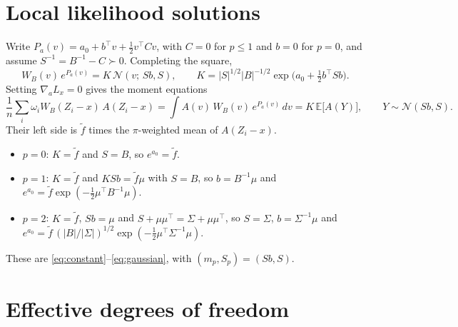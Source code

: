\documentclass[11pt]{article}
\newcommand{\E}{\mathbb{E}}
\newcommand{\N}{\mathcal{N}}
\begin{document}
\appendix

\section{Local likelihood solutions}
\label{app:locallik}

Write $P_a(v) = a_0 + b^\top v + \frac12 v^\top C v$, with $C = 0$ for $p \leq
1$ and $b = 0$ for $p = 0$, and assume $S^{-1} = B^{-1} - C \succ 0$.
Completing the square,
\[
  W_B(v)\, e^{P_a(v)} = K\, \N(v;\, S b, S), \qquad
  K = |S|^{1/2} |B|^{-1/2} \exp\bigl(a_0 + \tfrac12 b^\top S b\bigr).
\]
Setting $\nabla_a L_x = 0$ gives the moment equations
\[
  \frac1n \sum_i \omega_i W_B(Z_i - x)\, A(Z_i - x)
  = \int A(v)\, W_B(v)\, e^{P_a(v)}\, dv
  = K\, \E\bigl[A(Y)\bigr], \qquad Y \sim \N(Sb, S).
\]
Their left side is $\tilde f$ times the $\pi$-weighted mean of $A(Z_i - x)$.
\begin{itemize}
  \item $p = 0$: $K = \tilde f$ and $S = B$, so $e^{a_0} = \tilde f$.
  \item $p = 1$: $K = \tilde f$ and $K S b = \tilde f \mu$ with $S = B$, so
    $b = B^{-1}\mu$ and $e^{a_0} = \tilde f \exp(-\frac12 \mu^\top B^{-1}
    \mu)$.
  \item $p = 2$: $K = \tilde f$, $S b = \mu$ and $S + \mu\mu^\top =
    \Sigma + \mu\mu^\top$, so $S = \Sigma$, $b = \Sigma^{-1}\mu$ and
    $e^{a_0} = \tilde f\, (|B| / |\Sigma|)^{1/2}
    \exp(-\frac12 \mu^\top \Sigma^{-1} \mu)$.
\end{itemize}
These are \eqref{eq:constant}--\eqref{eq:gaussian}, with $(m_p, S_p) =
(Sb, S)$.

\section{Effective degrees of freedom}
\label{app:edf}
\end{document}

